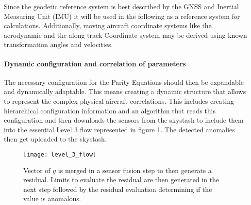 Since the geodetic reference system is best described by the GNSS and Inertial Measuring Unit (IMU) it will be used in the following as a reference system for calculations. Additionally, moving aircraft coordinate systems like the aerodynamic and the along track Coordinate system may be derived using known transformation angles and velocities. \cite{brockhaus_flugregelung_2011}




\paragraph{Dynamic configuration and correlation of parameters}

The necessary configuration for the Parity Equations should then be expandable and dynamically adaptable. This means creating a dynamic structure that allows to represent the complex physical aircraft correlations. This includes creating hierarchical configuration information and an algorithm that reads this configuration and then downloads the sensors from the skystash to include them into the essential Level 3 flow represented in figure \ref{fig:level_3_flow}. The detected anomalies then get uploaded to the skystash.

\begin{figure}
    \centering
    \texttt{[image: level\_3\_flow]}
    \caption{Vector of $y$ is merged in a sensor fusion step to then generate a residual. Limits to evaluate the residual are then generated in the next step followed by the residual evaluation determining if the value is anomalous.}
    \label{fig:level_3_flow}
\end{figure}

